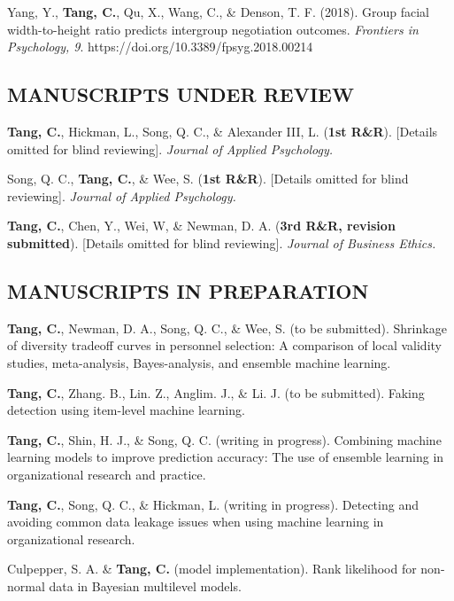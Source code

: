 \documentclass[
  20,
]{article}
\begin{document}
Yang, Y., \textbf{Tang, C.}, Qu, X., Wang, C., \& Denson, T. F. (2018).
Group facial width-to-height ratio predicts intergroup negotiation
outcomes. \emph{Frontiers in Psychology, 9}.
https://doi.org/10.3389/fpsyg.2018.00214

\hypertarget{manuscripts-under-review}{%
\subsection{\texorpdfstring{\textbf{MANUSCRIPTS UNDER
REVIEW}}{MANUSCRIPTS UNDER REVIEW}}\label{manuscripts-under-review}}

\textbf{Tang, C.}, Hickman, L., Song, Q. C., \& Alexander III, L.
(\textbf{1st R\&R}). {[}Details omitted for blind reviewing{]}.
\emph{Journal of Applied Psychology.}

Song, Q. C., \textbf{Tang, C.}, \& Wee, S. (\textbf{1st R\&R}).
{[}Details omitted for blind reviewing{]}. \emph{Journal of Applied
Psychology.}

\textbf{Tang, C.}, Chen, Y., Wei, W, \& Newman, D. A. (\textbf{3rd R\&R,
revision submitted}). {[}Details omitted for blind reviewing{]}.
\emph{Journal of Business Ethics.}

\hypertarget{manuscripts-in-preparation}{%
\subsection{\texorpdfstring{\textbf{MANUSCRIPTS IN
PREPARATION}}{MANUSCRIPTS IN PREPARATION}}\label{manuscripts-in-preparation}}

\textbf{Tang, C.}, Newman, D. A., Song, Q. C., \& Wee, S. (to be
submitted). Shrinkage of diversity tradeoff curves in personnel
selection: A comparison of local validity studies, meta-analysis,
Bayes-analysis, and ensemble machine learning.

\textbf{Tang, C.}, Zhang. B., Lin. Z., Anglim. J., \& Li. J. (to be
submitted). Faking detection using item-level machine learning.

\textbf{Tang, C.}, Shin, H. J., \& Song, Q. C. (writing in progress).
Combining machine learning models to improve prediction accuracy: The
use of ensemble learning in organizational research and practice.

\textbf{Tang, C.}, Song, Q. C., \& Hickman, L. (writing in progress).
Detecting and avoiding common data leakage issues when using machine
learning in organizational research.

Culpepper, S. A. \& \textbf{Tang, C.} (model implementation). Rank
likelihood for non-normal data in Bayesian multilevel models.
\end{document}
